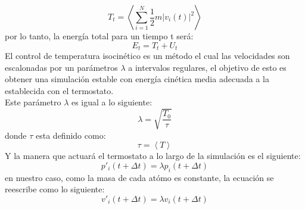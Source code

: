 \documentclass[reprint,amsmath,amssymb,aps,]{revtex4-2}
\begin{document}
\begin{equation}
    \label{eq:kin-n}
    T_t=\left\langle \sum_{i=1}^N \frac{1}{2}m|v_i(t)|^2\right\rangle
\end{equation}
por lo tanto, la energía total para un tiempo t será:
\begin{equation}
    \label{eq:e-tot}
    E_t=T_t+U_t
\end{equation}
El control de temperatura isocinético es un método el cual las velocidades son escalonadas por un parámetros $\lambda$ a intervalos regulares,
el objetivo de esto es obtener una simulación estable con energía cinética media adecuada a la establecida con el termostato.\\
Este parámetro $\lambda$ es igual a lo siguiente:
\begin{equation}
    \lambda = \sqrt{\frac{T_0}{\tau}}
    \label{eq:lambda}
\end{equation}
donde $\tau$ esta definido como:
\begin{equation}
    \tau = \left\langle T \right\rangle
\end{equation}
Y la manera que actuará el termostato a lo largo de la simulación es el siguiente:
\begin{equation}
    {p}'_i(t+\Delta t) = \lambda p_i(t+\Delta t)
\end{equation}
en nuestro caso, como la masa de cada atómo es constante, la ecuación se reescribe como lo siguiente:
\begin{equation*}
    {v}'_i(t+ \Delta t) = \lambda v_i(t+\Delta t)
\end{equation*}
\end{document}
